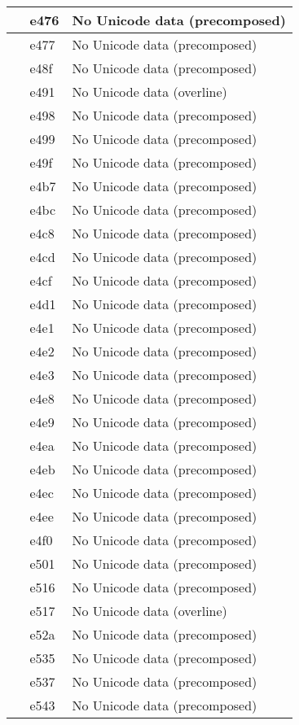 \documentclass[12pt,letterpaper,openany]{book}
\begin{document}
\begin{center}
\begin{supertabular}{|m{0.25in}|m{0.5in}|m{4in}|}
 & e476 & No Unicode data (precomposed)\\\hline
 & e477 & No Unicode data (precomposed)\\\hline
 & e48f & No Unicode data (precomposed)\\\hline
 & e491 & No Unicode data (overline)\\\hline
 & e498 & No Unicode data (precomposed)\\\hline
 & e499 & No Unicode data (precomposed)\\\hline
 & e49f & No Unicode data (precomposed)\\\hline
 & e4b7 & No Unicode data (precomposed)\\\hline
 & e4bc & No Unicode data (precomposed)\\\hline
 & e4c8 & No Unicode data (precomposed)\\\hline
 & e4cd & No Unicode data (precomposed)\\\hline
 & e4cf & No Unicode data (precomposed)\\\hline
 & e4d1 & No Unicode data (precomposed)\\\hline
 & e4e1 & No Unicode data (precomposed)\\\hline
 & e4e2 & No Unicode data (precomposed)\\\hline
 & e4e3 & No Unicode data (precomposed)\\\hline
 & e4e8 & No Unicode data (precomposed)\\\hline
 & e4e9 & No Unicode data (precomposed)\\\hline
 & e4ea & No Unicode data (precomposed)\\\hline
 & e4eb & No Unicode data (precomposed)\\\hline
 & e4ec & No Unicode data (precomposed)\\\hline
 & e4ee & No Unicode data (precomposed)\\\hline
 & e4f0 & No Unicode data (precomposed)\\\hline
 & e501 & No Unicode data (precomposed)\\\hline
 & e516 & No Unicode data (precomposed)\\\hline
 & e517 & No Unicode data (overline)\\\hline
 & e52a & No Unicode data (precomposed)\\\hline
 & e535 & No Unicode data (precomposed)\\\hline
 & e537 & No Unicode data (precomposed)\\\hline
 & e543 & No Unicode data (precomposed)\\\hline

\end{supertabular}
\end{center}
\end{document}
